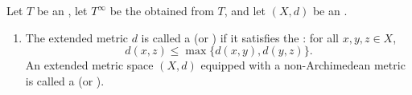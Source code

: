 \begin{definition}\label{definition:archimedean_and_nonarchimedean_extended_metrics_on_sets_valued_in_ordered_commutative_monoid_with_adjoined_infinity}
    Let $T$ be an , let $T^\infty$ be the  obtained from $T$, and let $(X, d)$ be an .

    \begin{enumerate}
        \item The extended metric $d$ is called a  (or ) if it satisfies the : for all $x, y, z \in X$,
        $$
            d(x, z) \leq \max\{d(x, y), d(y, z)\}.
        $$
        An extended metric space $(X, d)$ equipped with a non-Archimedean metric is called a  (or ).
    \end{enumerate}

\end{definition}
